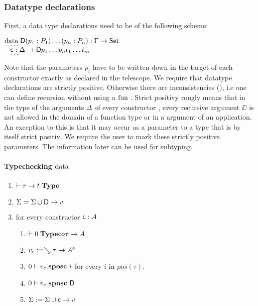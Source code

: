 \subsubsection{Datatype declarations}

First, a data type declarations need to be of the following scheme:
\begin{bsp}
$\mathrm{data}\; \mathsf{D} (p_1 : P_1) \ldots (p_n : P_n) : \Gamma \rightarrow \mathsf{Set} $\\
$\hspace*{3mm} \ldots$\\
$\hspace*{3mm} \mathsf{c} : \Delta \rightarrow \mathsf{D} p_1 \ldots p_n t_1 \ldots t_m$\\
$\hspace*{3mm} \ldots$\\   
\end{bsp}
Note that the parameters $p_i$ have to be written down in the target of each constructor exactly as declared in the telescope.  
We require that datatype declarations are strictly positive.
Otherwise there are inconsistencies (\cite{paulinmohring93inductive}), i.e one can define recursion without using a $\mathrm{fun}\;$.
Strict positivy rougly means that in the type of the arguments $\Delta$ of every constructor , every recursive argument $\DD$ is not allowed in the domain of a function type or in a argument of an application.
An exception to this is that it may occur as a parameter to a type that is by itself strict positiv.
We require the user to mark these strictly positive parameters.
The information later can be used for subtyping.
\paragraph*{Typechecking $\mathrm{data}\;$}

\newcommand{\sposc}[3]{#1\vdash#2\mbox{ \textbf{sposc} }#3}
\newcommand{\spos}[3]{#1\vdash#2\mbox{ \textbf{spos} }#3}

\begin{enumerate}
\item
$\vdash\tau \rightarrow t\;\mathbf{Type}$
\item
$\mathrm{\Sigma} = \mathrm{\Sigma} \cup {\mathsf{D}\rightarrow v}$
\item
for every constructor $\mathsf{c} : A $
\begin{enumerate} 
\item
$\vdash0\;\mathbf{Type}{\diamond}{\diamond}{\tau \rightarrow A}$
\item
$v_c := \searrow \tau \rightarrow A^{\diamond}$
\item
$\sposc{0}{v_c}{i}$ for every $i$ in $pos(\tau)$.
\item
$\sposc{0}{v_c}{\DD}$
\item
$\mathrm{\Sigma} := \mathrm{\Sigma} \cup {\mathsf{c}\rightarrow v}$
\end{enumerate}
\end{enumerate}

